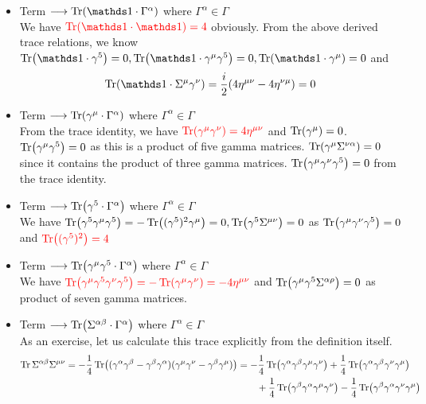 \begin{itemize}
    \item Term $\longrightarrow \Tr (\iden \cdot \Gamma^\alpha)$ where $\Gamma^\alpha \in \Gamma$ \\[0.2cm]
    We have $\mathcolor{red}{\Tr (\iden \cdot \iden) = 4}$ obviously. From the above derived trace relations, we know $\Tr (\iden \cdot \gamma^5) = 0,\Tr (\iden \cdot \gamma^\mu\gamma^5)=0, \Tr (\iden \cdot \gamma^\mu)=0$ and $$\Tr (\iden \cdot \Sigma^\mu \gamma^\nu) = \frac{i}{2}\qty(4\eta^{\mu\nu} - 4\eta^{\nu\mu}) = 0$$
\item Term $\longrightarrow \Tr (\gamma^\mu \cdot \Gamma^\alpha)$ where $\Gamma^\alpha \in \Gamma$ \\[0.2cm]
From the trace identity, we have $\mathcolor{red}{\Tr(\gamma^\mu \gamma^\nu) = 4\eta^{\mu\nu}}$ and $\Tr(\gamma^\mu) = 0$. $\Tr(\gamma^\mu \gamma^5) =0$ as this is a product of five gamma matrices. $\Tr(\gamma^\mu \Sigma^{\nu\alpha}) = 0$ since it contains the product of three gamma matrices. $\Tr(\gamma^\mu \gamma^\nu \gamma^5) =0$ from the trace identity. 
\item Term $\longrightarrow \Tr (\gamma^5 \cdot \Gamma^\alpha)$ where $\Gamma^\alpha \in \Gamma$ \\[0.2cm]
We have $\Tr(\gamma^5 \gamma^\mu \gamma^5) = -\Tr((\gamma^5)^2  \gamma^\mu)= 0, \Tr(\gamma^5 \Sigma^{\mu\nu}) = 0$ as $\Tr(\gamma^\mu \gamma^\nu \gamma^5) =0$ and $\mathcolor{red}{\Tr((\gamma^5)^2) = 4}$
\item Term $\longrightarrow \Tr (\gamma^\mu \gamma^5 \cdot \Gamma^\alpha)$ where $\Gamma^\alpha \in \Gamma$ \\[0.2cm]
We have $\mathcolor{red}{\Tr(\gamma^\mu \gamma^5 \gamma^\nu\gamma^5)  = - \Tr(\gamma^\mu \gamma^\nu) =-4\eta^{\mu\nu}}$ and $\Tr(\gamma^\mu \gamma^5 \Sigma^{\alpha\rho}) =0$ as product of seven gamma matrices.
\item Term $\longrightarrow \Tr (\Sigma^{\alpha\beta} \cdot \Gamma^\alpha)$ where $\Gamma^\alpha \in \Gamma$ \\[0.2cm]
As an exercise, let us calculate this trace explicitly from the definition itself. 
    \begin{align*}
        \Tr \Sigma^{\alpha\beta}\Sigma^{\mu\nu} =-\frac{1}{4} \Tr ((\gamma^\alpha\gamma^\beta-\gamma^\beta\gamma^\alpha)(\gamma^\mu\gamma^\nu-\gamma^\beta\gamma^\mu)) &= -\frac{1}{4}\Tr (\gamma^\alpha\gamma^\beta \gamma^\mu \gamma^\nu) +\frac{1}{4}\Tr(\gamma^\alpha\gamma^\beta \gamma^\nu \gamma^\mu)\\ &\qquad +\frac{1}{4}\Tr(\gamma^\beta\gamma^\alpha \gamma^\mu \gamma^\nu) -\frac{1}{4}\Tr(\gamma^\beta\gamma^\alpha \gamma^\nu \gamma^\mu) 

\end{align*}
\end{itemize}

